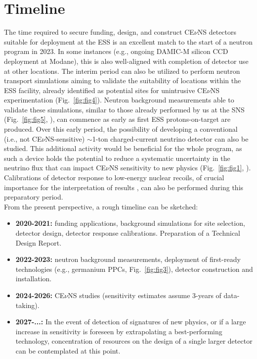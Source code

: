 \documentclass[12pt]{article}
\begin{document}
\newpage

\section{Timeline}

The time required to secure funding, design, and construct CE$\nu$NS detectors suitable for deployment at the ESS is an excellent match to the start of a neutron program in 2023. In some instances (e.g., ongoing DAMIC-M silicon CCD deployment at Modane), this is also well-aligned with  completion of detector use at other locations. The interim period can also be  utilized to perform neutron transport simulations aiming to validate the suitability of locations within the ESS facility,  already identified as potential  sites for unintrusive CE$\nu$NS experimentation (Fig.\ \ref{fig:fig4}). Neutron background measurements able to validate these simulations, similar to those already performed by us at the SNS (Fig.\ \ref{fig:fig5}, \cite{science,bjorn}), can commence as early as first ESS protons-on-target are produced. Over this early period, the possibility  of developing a conventional (i.e., not CE$\nu$NS-sensitive) $\sim$1-ton charged-current neutrino detector \cite{d2o} can also be studied. This additional activity would be beneficial for the whole program, as such a device  holds the potential to reduce a systematic uncertainty in the neutrino flux that can impact CE$\nu$NS sensitivity to new physics (Fig.\ \ref{fig:fig1}, \cite{ESS}). Calibrations of detector response to low-energy nuclear recoils, of crucial importance for the interpretation of results \cite{csiqf}, can also be performed during this preparatory period. \\

From the present perspective, a rough timeline can be sketched:


\begin{itemize}
\item {\bf 2020-2021:} funding applications, background simulations for site selection, detector design, detector response calibrations. Preparation of a Technical Design Report. 
\item {\bf 2022-2023:} neutron background measurements, deployment of first-ready technologies (e.g., germanium PPCs, Fig.\ \ref{fig:fig3}), detector construction and installation.  
\item {\bf 2024-2026:} CE$\nu$NS studies (sensitivity estimates \cite{ESS} assume 3-years of data-taking).
\item {\bf 2027-...:} In the event of detection of signatures of new physics, or if a large increase in sensitivity is foreseen by extrapolating a best-performing technology, concentration of resources on the design of a single larger detector can be contemplated at this point.  
\end{itemize}
\end{document}
